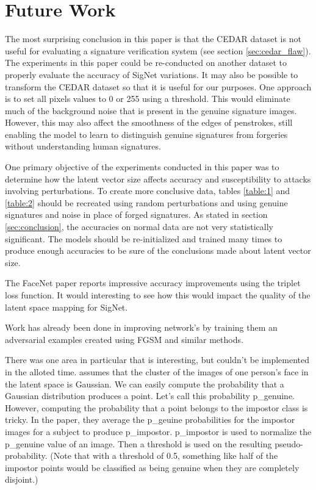 \section{Future Work}\label{sec:future_work}

The most surprising conclusion in this paper is that the CEDAR dataset is not useful for evaluating a signature verification system (see section \ref{sec:cedar_flaw}).
The experiments in this paper could be re-conducted on another dataset to properly evaluate the accuracy of SigNet variations.
It may also be possible to transform the CEDAR dataset so that it is useful for our purposes.
One approach is to set all pixels values to 0 or 255 using a threshold.
This would eliminate much of the background noise that is present in the genuine signature images.
However, this may also affect the smoothness of the edges of penstrokes, still enabling the model to learn to distinguish genuine signatures from forgeries without understanding human signatures.

One primary objective of the experiments conducted in this paper was to determine how the latent vector size affects accuracy and susceptibility to attacks involving perturbations.
To create more conclusive data, tables \ref{table:1} and \ref{table:2} should be recreated using random perturbations and using genuine signatures and noise in place of forged signatures.
As stated in section \ref{sec:conclusion}, the accuracies on normal data are not very statistically significant.
The models should be re-initialized and trained many times to produce enough accuracies to be sure of the conclusions made about latent vector size.

The FaceNet paper reports impressive accuracy improvements using the triplet loss function.
It would interesting to see how this would impact the quality of the latent space mapping for SigNet.

Work has already been done in improving network's by training them an adversarial examples created using FGSM and similar methods.

There was one area in particular that is interesting, but couldn't be implemented in the alloted time.
\cite{LeCun} assumes that the cluster of the images of one person's face in the latent space is Gaussian.
We can easily compute the probability that a Gaussian distribution produces a point.
Let's call this probability p\_genuine.
However, computing the probability that a point belongs to the impostor class is tricky.
In the paper, they average the p\_geuine probabilities for the impostor images for a subject to produce p\_impostor.
p\_impostor is used to normalize the p\_genuine value of an image.
Then a threshold is used on the resulting pseudo-probability.
(Note that with a threshold of 0.5, something like half of the impostor points would be classified as being genuine when they are completely disjoint.)

